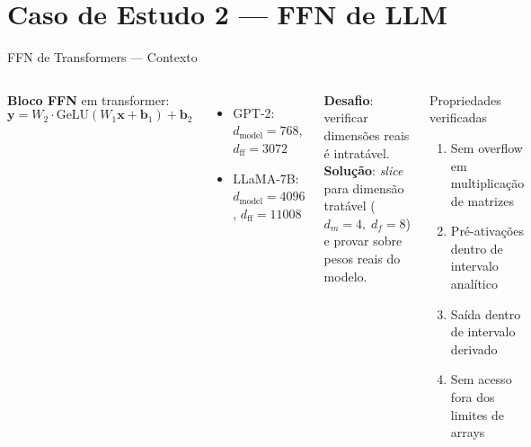 \documentclass[aspectratio=169]{beamer}
\begin{document}
\section{Caso de Estudo 2 --- FFN de LLM}

\begin{frame}{FFN de Transformers --- Contexto}
  \begin{columns}
    \textbf{Bloco FFN} em transformer:
    \[
      \mathbf{y} = W_2 \cdot \mathrm{GeLU}(W_1 \mathbf{x} + \mathbf{b}_1) + \mathbf{b}_2
    \]
    \begin{itemize}
      \item GPT-2:\quad $d_\text{model}=768$,\; $d_\text{ff}=3072$
      \item LLaMA-7B:\; $d_\text{model}=4096$,\; $d_\text{ff}=11008$
    \end{itemize}
    \vspace{0.4em}
    \textbf{Desafio}: verificar dimensões reais é intratável.\\
    \textbf{Solução}: \emph{slice} para dimensão tratável
    ($d_m=4,\; d_f=8$) e provar sobre pesos reais do modelo.

    \begin{block}{Propriedades verificadas}
      \begin{enumerate}
        \item Sem overflow em multiplicação de matrizes
        \item Pré-ativações dentro de intervalo analítico
        \item Saída dentro de intervalo derivado
        \item Sem acesso fora dos limites de arrays
      \end{enumerate}
    \end{block}
  \end{columns}
\end{frame}
\end{document}
